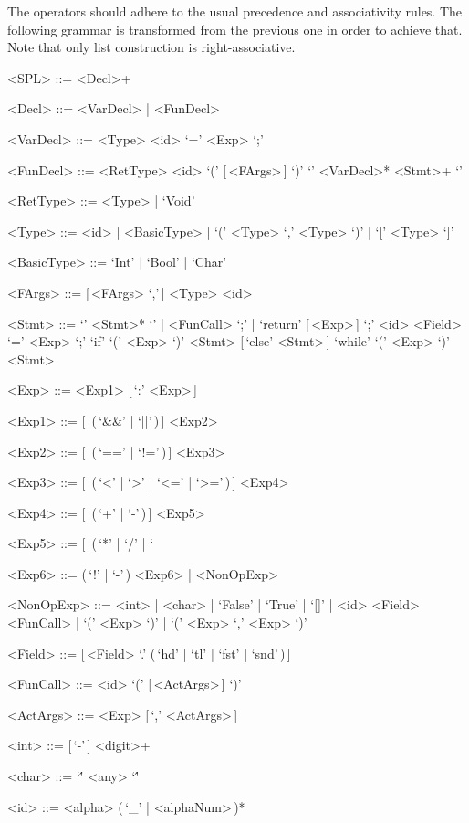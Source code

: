 \documentclass{article}
\begin{document}
The operators should adhere to the usual precedence and associativity rules.
The following grammar is transformed from the previous one in order to achieve that.
Note that only list construction is right-associative.
\setlength{\grammarindent}{7.1em}
\begin{grammar}
    <SPL> ::= <Decl>+

    <Decl> ::= <VarDecl> | <FunDecl>

    <VarDecl> ::= <Type> <id> `=' <Exp> `;'

    <FunDecl> ::= <RetType> <id> `(' [\,<FArgs>\,] `)' `{' <VarDecl>* <Stmt>+ `}'

    <RetType> ::= <Type> | `Void'

    <Type> ::= <id> | <BasicType> | `(' <Type> `,' <Type> `)' | `[' <Type> `]'

    <BasicType> ::= `Int' | `Bool' | `Char'

    <FArgs> ::= [\,<FArgs> `,'\,] <Type> <id>

    <Stmt> ::= `{' <Stmt>* `}' | <FunCall> `;' | `return' [\,<Exp>\,] `;'
    \alt <id> <Field> `=' <Exp> `;'
    \alt `if' `(' <Exp> `)' <Stmt> [\,`else' <Stmt>\,]
    \alt `while' `(' <Exp> `)' <Stmt>

    <Exp> ::= <Exp1> [\,`:' <Exp>\,]

    <Exp1> ::= [\,<Exp1> (\,`&&' | `||'\,)\,] <Exp2>

    <Exp2> ::= [\,<Exp2> (\,`==' | `!='\,)\,] <Exp3>

    <Exp3> ::= [\,<Exp3> (\,`<' | `>' | `<=' | `>='\,)\,] <Exp4>

    <Exp4> ::= [\,<Exp4> (\,`+' | `-'\,)\,] <Exp5>

    <Exp5> ::= [\,<Exp5> (\,`*' | `/' | `%

    <Exp6> ::= (\,`!' | `-'\,) <Exp6> | <NonOpExp>

    <NonOpExp> ::= <int> | <char> | `False' | `True' | `[]' | <id> <Field>
    \alt <FunCall> | `(' <Exp> `)' | `(' <Exp> `,' <Exp> `)'

    <Field> ::= [\,<Field> `.' (\,`hd' | `tl' | `fst' | `snd'\,)\,]

    <FunCall> ::= <id> `(' [\,<ActArgs>\,] `)'

    <ActArgs> ::= <Exp> [\,`,' <ActArgs>\,]

    <int> ::= [\,`-'\,] <digit>+

    <char> ::= `\'' <any> `\''

    <id> ::= <alpha> (\,`_' | <alphaNum>\,)*
\end{grammar}
\end{document}
